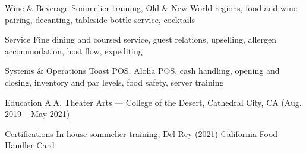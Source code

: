 \documentclass[10pt, letterpaper]{awesome-cv}
\begin{document}

\begin{cvskills}

  \cvskill
    {Wine \& Beverage}
    {Sommelier training, Old \& New World regions, food-and-wine pairing, decanting, tableside bottle service, cocktails}

  \cvskill
    {Service}
    {Fine dining and coursed service, guest relations, upselling, allergen accommodation, host flow, expediting}

  \cvskill
    {Systems \& Operations}
    {Toast POS, Aloha POS, cash handling, opening and closing, inventory and par levels, food safety, server training}

\end{cvskills}



\begin{cvskills}

  \cvskill
    {Education}
    {A.A. Theater Arts --- College of the Desert, Cathedral City, CA (Aug. 2019 -- May 2021)}

  \cvskill
    {Certifications}
    {In-house sommelier training, Del Rey (2021) \enskip\textbullet\enskip California Food Handler Card}

\end{cvskills}


\end{document}
